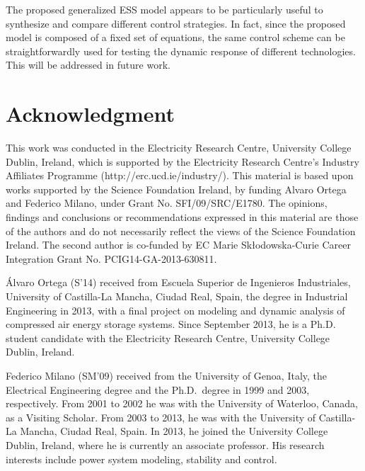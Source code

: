 \documentclass[journal, a4paper]{IEEEtran}
\begin{document}
The proposed generalized ESS model appears to be particularly useful to
synthesize and compare different control strategies.  In fact, since
the proposed model is composed of a fixed set of equations, the same
control scheme can be straightforwardly used for testing the dynamic
response of different technologies. This will be addressed in future
work.




\section*{Acknowledgment}

This work was conducted in the Electricity Research Centre, 
University College Dublin, Ireland, which is supported by the 
Electricity Research Centre’s Industry Affiliates Programme 
(http://erc.ucd.ie/industry/). This material is based upon works 
supported by the Science Foundation Ireland, by funding Alvaro Ortega 
and Federico Milano, under Grant No. SFI/09/SRC/E1780. The opinions, 
findings and conclusions or recommendations expressed in this material 
are those of the authors and do not necessarily reflect the views of the 
Science Foundation Ireland. The second author is co-funded by EC Marie 
Sk{\l}odowska-Curie Career Integration Grant No. PCIG14-GA-2013-630811.







\begin{biography}
  {{\'Alvaro Ortega}} (S'14) received from Escuela Superior de
  Ingenieros Industriales, University of Castilla-La Mancha, Ciudad
  Real, Spain, the degree in Industrial Engineering in 2013, with a
  final project on modeling and dynamic analysis of compressed air
  energy storage systems.  Since September 2013, he is a Ph.D. student
  candidate with the Electricity Research Centre, University College
  Dublin, Ireland.
\end{biography}



\begin{biography}
  {Federico Milano} (SM'09) received from the University of Genoa,
  Italy, the Electrical Engineering degree and the Ph.D.~degree in
  1999 and 2003, respectively.  From 2001 to 2002 he was with the
  University of Waterloo, Canada, as a Visiting Scholar.  From 2003 to
  2013, he was with the University of Castilla-La Mancha, Ciudad Real,
  Spain.  In 2013, he joined the University College Dublin, Ireland,
  where he is currently an associate professor.  His research
  interests include power system modeling, stability and control.
\end{biography}
\end{document}
